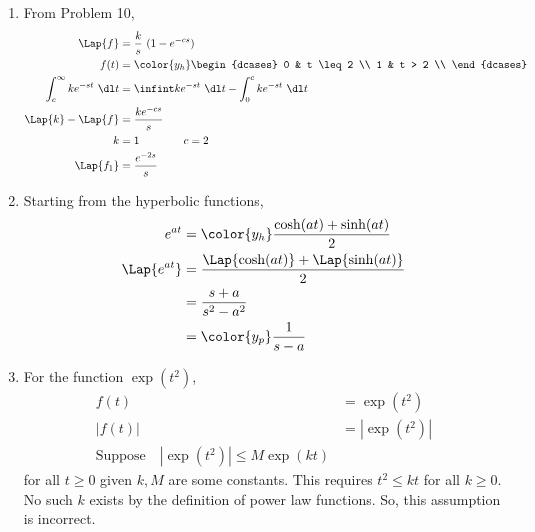 \begin{enumerate}
    \item From Problem 10,
          \begin{align}
              \Lap \{f\}                        & = \frac{k}{s}\ (1 - e^{-cs}) \\
              f(t)                              & = \color{y_h}
              \begin{dcases}
                  0 & t \leq 2 \\
                  1 & t > 2    \\
              \end{dcases}                                                    \\
              \int_{c}^{\infty} ke^{-st}\ \dl t & = \infint ke^{-st}\ \dl t
              - \int_{0}^{c} ke^{-st}\ \dl t                                   \\
              \Lap\{k\} - \Lap\{f\}             & = \frac{ke^{-cs}}{s}         \\
              k                                 & = 1 \qquad \qquad c = 2      \\
              \Lap\{f_1\}                       & = \frac{e^{-2s}}{s}
          \end{align}
    \item Starting from the hyperbolic functions,
          \begin{align}
              e^{at}         & = \color{y_h}\frac{\cosh(at) + \sinh(at)}{2}      \\
              \Lap\{e^{at}\} & = \frac{\Lap\{\cosh(at)\} + \Lap\{\sinh(at)\}}{2} \\
                             & = \frac{s+a}{s^2 - a^2}                           \\
                             & = \color{y_p} \frac{1}{s-a}
          \end{align}

    \item For the function $ \exp(t^2) $,
          \begin{align}
              f(t)   & = \exp(t^2)   \\
              |f(t)| & = |\exp(t^2)| \\
              \text{Suppose} \quad |\exp(t^2)| \leq M\exp(kt)
          \end{align}
          for all $ t \geq 0 $ given $ k, M $ are some constants. This requires
          $ t^2 \leq kt $ for all $ k \geq 0 $. No such $ k $ exists by the definition
          of power law functions. So, this assumption is incorrect.


\end{enumerate}
